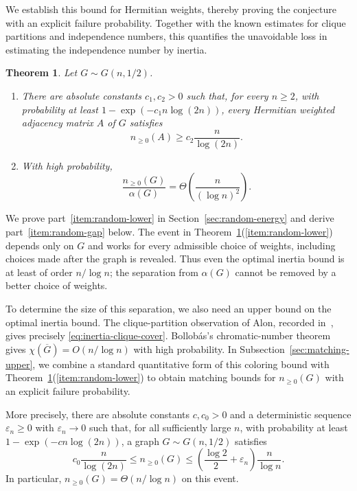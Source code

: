 \documentclass[11pt]{article}
\numberwithin{equation}{section}
\newtheorem{theorem}{Theorem}[section]
\theoremstyle{definition}
\theoremstyle{remark}
\begin{document}
We establish this bound for Hermitian weights, thereby proving the
conjecture with an explicit failure probability. Together with the
known estimates for clique partitions and independence numbers,
this quantifies the unavoidable loss in estimating the independence
number by inertia.
\begin{theorem}\label{thm:main-random}
Let $G\sim G(n,1/2)$.
\begin{enumerate}
\item\label{item:random-lower}
There are absolute constants $c_1,c_2>0$ such that, for every $n\geq2$,
with probability at least $1-\exp(-c_1n\log(2n))$, every Hermitian
weighted adjacency matrix $A$ of $G$ satisfies
\[
 n_{\geq0}(A)\geq c_2\frac{n}{\log(2n)}.
\]
\item\label{item:random-gap}
With high probability,
\begin{equation}\label{eq:random-inertia-gap}
 \frac{n_{\geq0}(G)}{\alpha(G)}
 =\Theta\!\left(\frac{n}{(\log n)^2}\right).
\end{equation}
\end{enumerate}
\end{theorem}
We prove part~\ref{item:random-lower} in Section~\ref{sec:random-energy}
and derive part~\ref{item:random-gap} below.
The event in Theorem~\ref{thm:main-random}(\ref{item:random-lower})
depends only on $G$ and works for every admissible choice of weights, including choices
made after the graph is revealed. Thus even the optimal inertia
bound is at least of order $n/\log n$; the separation from
$\alpha(G)$ cannot be removed by a better choice of weights.

To determine the size of this separation, we also need an upper
bound on the optimal inertia bound. The clique-partition observation
of Alon, recorded in~\cite[Section~4]{KW}, gives precisely
\eqref{eq:inertia-clique-cover}. Bollob\'as's chromatic-number
theorem~\cite{Bollobas} gives $\chi(\overline G)=O(n/\log n)$ with
high probability. In Subsection~\ref{sec:matching-upper}, we combine
a standard quantitative form of this coloring bound with
Theorem~\ref{thm:main-random}(\ref{item:random-lower}) to obtain matching
bounds for $n_{\geq0}(G)$ with an explicit failure probability.

More precisely, there are absolute constants $c,c_0>0$ and a
deterministic sequence $\varepsilon_n\geq0$ with $\varepsilon_n\to0$ such that, for all
sufficiently large $n$, with probability at least
$1-\exp(-cn\log(2n))$, a graph $G\sim G(n,1/2)$ satisfies
\begin{equation}\label{eq:random-order}
 c_0\frac{n}{\log(2n)}
 \leq n_{\geq0}(G)
 \leq\left(\frac{\log 2}{2}+\varepsilon_n\right)
       \frac{n}{\log n}.
\end{equation}
In particular, $n_{\geq0}(G)=\Theta(n/\log n)$ on this event.
\end{document}
